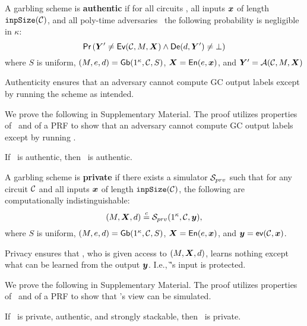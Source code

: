 \begin{definition}[Authenticity]\label{def:authenticity}
  A garbling scheme is \textbf{authentic} if for
  all circuits \cir,
  all inputs $\cirinp$ of length $\mathtt{inpSize}(\mathcal C)$,
  and all poly-time adversaries \adv\
  the following probability is negligible in $\kappa$:
  \[
    \pr{\gcirout' \neq \gEv(\cir, \mat,\gcirinp)
    \land
    \gDe(d, \gcirout') \neq \bot}
  \]
  where
  $S$ is uniform,
  $(M, e, d) = \textsf{Gb}(1^\kappa,\mathcal C,S)$,
  $\gcirinp = \gEn(e,\cirinp)$,
  and $\gcirout' = \adv(\cir, \mat, \gcirinp)$
\end{definition}

Authenticity ensures that an adversary cannot compute GC output labels
except by running the scheme as intended.

We prove the following in Supplementary Material. The proof
utilizes properties of \underscheme\ and of a PRF to show
that an adversary cannot compute GC output labels except by running
\ourschemelong.

\begin{theorem}\label{thm:authenticity}
  If \underscheme\ is authentic, then \ourschemelong\ is authentic.
\end{theorem}

\begin{definition}[Privacy]\label{def:privacy}
  A garbling scheme is \textbf{private} if
  there exists a simulator $\mathcal{S}_{prv}$ such that for
  any circuit $\mathcal C$
  and all inputs $\cirinp$ of length $\mathtt{inpSize}(\mathcal C)$,
  the following are computationally indistinguishable:
   \[
  (\mat, \gcirinp, d)
  \indist
  \simulator_{prv}(1^\kappa, \cir, \cirout),
  \]
  where
  $S$ is uniform,
   $(M, e, d) = \textsf{Gb}(1^\kappa,\mathcal C,S)$,
  $\gcirinp = \gEn(e,\cirinp)$,
  and $\cirout = \gev(\cir,\cirinp)$.
\end{definition}


Privacy ensures that \E, who is given access to
$(\mat, \gcirinp, d)$, learns nothing except what can be learned from the output
$\cirout$. I.e., \G's input is protected.

We prove the following in Supplementary Material. The proof
utilizes properties of \underscheme\ and of a PRF to show
that \E's view can be simulated.

\begin{theorem}\label{thm:privacy}
  If \underscheme\ is private, authentic, and strongly stackable, then
  \ourschemelong\ is private.
\end{theorem}
